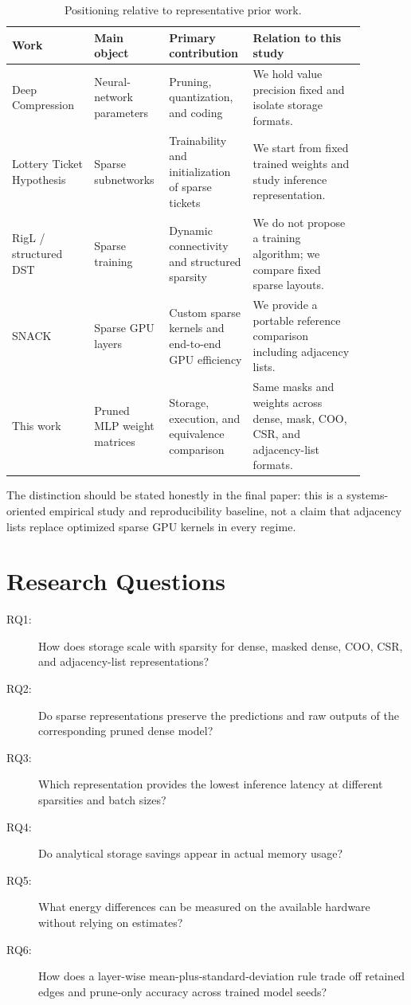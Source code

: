 \documentclass[11pt]{article}
\begin{document}
\begin{table}[ht]
\centering
\caption{Positioning relative to representative prior work.}
\label{tab:positioning}
\small
\begin{tabular}{p{0.22\linewidth}p{0.18\linewidth}p{0.18\linewidth}p{0.30\linewidth}}
\toprule
Work & Main object & Primary contribution & Relation to this study \\
\midrule
Deep Compression & Neural-network parameters & Pruning, quantization, and coding & We hold value precision fixed and isolate storage formats. \\
Lottery Ticket Hypothesis & Sparse subnetworks & Trainability and initialization of sparse tickets & We start from fixed trained weights and study inference representation. \\
RigL / structured DST & Sparse training & Dynamic connectivity and structured sparsity & We do not propose a training algorithm; we compare fixed sparse layouts. \\
SNACK & Sparse GPU layers & Custom sparse kernels and end-to-end GPU efficiency & We provide a portable reference comparison including adjacency lists. \\
This work & Pruned MLP weight matrices & Storage, execution, and equivalence comparison & Same masks and weights across dense, mask, COO, CSR, and adjacency-list formats. \\
\bottomrule
\end{tabular}
\end{table}

The distinction should be stated honestly in the final paper: this is a
systems-oriented empirical study and reproducibility baseline, not a claim
that adjacency lists replace optimized sparse GPU kernels in every regime.

\section{Research Questions}

\begin{description}
    \item[RQ1:] How does storage scale with sparsity for dense, masked dense,
    COO, CSR, and adjacency-list representations?
    \item[RQ2:] Do sparse representations preserve the predictions and raw
    outputs of the corresponding pruned dense model?
    \item[RQ3:] Which representation provides the lowest inference latency at
    different sparsities and batch sizes?
    \item[RQ4:] Do analytical storage savings appear in actual memory usage?
    \item[RQ5:] What energy differences can be measured on the available
    hardware without relying on estimates?
    \item[RQ6:] How does a layer-wise mean-plus-standard-deviation rule trade
    off retained edges and prune-only accuracy across trained model seeds?
\end{description}
\end{document}
